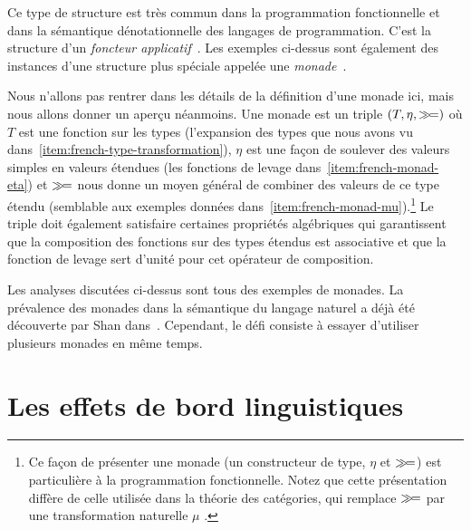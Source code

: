 Ce type de structure est très commun dans la programmation fonctionnelle et dans
la sémantique dénotationnelle des langages de programmation. C'est la structure
d'un \emph{foncteur applicatif}~\cite{mcbride2008applicative}. Les exemples
ci-dessus sont également des instances d'une structure plus spéciale appelée une
\emph{monade}~\cite{moggi1991notions}.

Nous n'allons pas rentrer dans les détails de la définition d'une monade ici,
mais nous allons donner un aperçu néanmoins. Une monade est un triple $(T, \eta,
\mathbin{\gg\!=})$ où $T$ est une fonction sur les types (l'expansion des types que nous
avons vu dans~\ref{item:french-type-transformation}), $\eta$ est une façon de
soulever des valeurs simples en valeurs étendues (les fonctions de levage
dans~\ref{item:french-monad-eta}) et $\mathbin{\gg\!=}$ nous donne un moyen général de
combiner des valeurs de ce type étendu (semblable aux exemples données
dans~\ref{item:french-monad-mu}).\footnote{Ce façon de présenter une monade (un
  constructeur de type, $\eta$ et $\mathbin{\gg\!=}$) est particulière à la programmation
  fonctionnelle. Notez que cette présentation diffère de celle utilisée dans la
  théorie des catégories, qui remplace $\mathbin{\gg\!=}$ par une transformation
  naturelle $\mu$ \cite{mac1978categories}.} Le triple doit également satisfaire
certaines propriétés algébriques qui garantissent que la composition des
fonctions sur des types étendus est associative et que la fonction de levage
sert d'unité pour cet opérateur de composition.

Les analyses discutées ci-dessus sont tous des exemples de monades. La
prévalence des monades dans la sémantique du langage naturel a déjà été
découverte par Shan dans~\cite{shan2002monads}. Cependant, le défi consiste à
essayer d'utiliser plusieurs monades en même temps.


\section*{Les effets de bord linguistiques}

